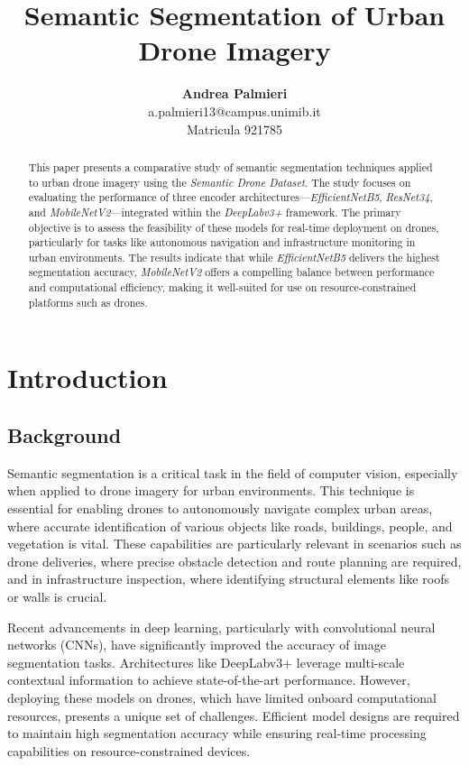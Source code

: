 \documentclass[a4paper]{article}
\title{Semantic Segmentation of Urban Drone Imagery}
\author{
\textbf{Andrea Palmieri} \\  a.palmieri13@campus.unimib.it \\ Matricula  921785
}
\begin{document}
\maketitle

\begin{abstract}
This paper presents a comparative study of semantic segmentation techniques applied to urban drone imagery using the \textit{Semantic Drone Dataset}. The study focuses on evaluating the performance of three encoder architectures—\textit{EfficientNetB5}, \textit{ResNet34}, and \textit{MobileNetV2}—integrated within the \textit{DeepLabv3+} framework. The primary objective is to assess the feasibility of these models for real-time deployment on drones, particularly for tasks like autonomous navigation and infrastructure monitoring in urban environments. The results indicate that while \textit{EfficientNetB5} delivers the highest segmentation accuracy, \textit{MobileNetV2} offers a compelling balance between performance and computational efficiency, making it well-suited for use on resource-constrained platforms such as drones. 
\end{abstract}

\section{Introduction}
\subsection{Background}
Semantic segmentation is a critical task in the field of computer vision, especially when applied to drone imagery for urban environments. This technique is essential for enabling drones to autonomously navigate complex urban areas, where accurate identification of various objects like roads, buildings, people, and vegetation is vital. These capabilities are particularly relevant in scenarios such as drone deliveries, where precise obstacle detection and route planning are required, and in infrastructure inspection, where identifying structural elements like roofs or walls is crucial.

Recent advancements in deep learning, particularly with convolutional neural networks (CNNs), have significantly improved the accuracy of image segmentation tasks. Architectures like DeepLabv3+ leverage multi-scale contextual information to achieve state-of-the-art performance. However, deploying these models on drones, which have limited onboard computational resources, presents a unique set of challenges. Efficient model designs are required to maintain high segmentation accuracy while ensuring real-time processing capabilities on resource-constrained devices.
\end{document}
